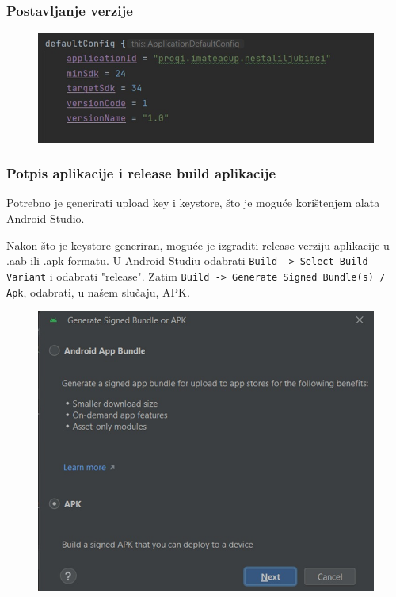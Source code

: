 		\subsubsection{Postavljanje verzije}
		
		\begin{figure}[H]
			\includegraphics[scale=0.5]{slike/deploy3.jpg} %
			\centering
			\label{fig:deploy3}
		\end{figure}
		
		\subsubsection{Potpis aplikacije i release build aplikacije}
		
		Potrebno je generirati upload key i keystore, što je moguće korištenjem alata Android Studio.
		
		Nakon što je keystore generiran, moguće je izgraditi release verziju aplikacije u .aab ili .apk formatu. U Android Studiu odabrati \texttt{Build -> Select Build Variant} i odabrati "release". Zatim \texttt{Build -> Generate Signed Bundle(s) / Apk}, odabrati, u našem slučaju, APK.
		
		\begin{figure}[H]
			\includegraphics[scale=0.45]{slike/deploy4.jpg} %
			\centering
			\label{fig:deploy4}
		\end{figure}
		
